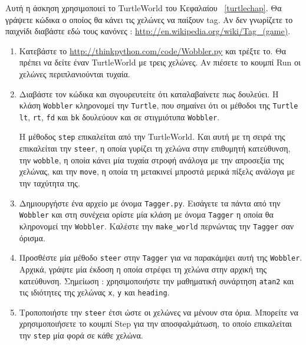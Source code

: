 \documentclass[10pt]{book}
\begin{document}
\begin{exercise}

Αυτή η άσκηση χρησιμοποιεί το  TurtleWorld  του Κεφαλαίου~ \ref{turtlechap}.   
Θα γράψετε κώδικα ο οποίος θα κάνει τις χελώνες να παίξουν  tag.  Αν δεν γνωρίζετε το 
παιχνίδι διαβάστε εδώ τους κανόνες : \url{http://en.wikipedia.org/wiki/Tag_(game)}.  

\begin{enumerate}

\item Κατεβάστε το  \url{http://thinkpython.com/code/Wobbler.py}  και τρέξτε το.  
Θα πρέπει να δείτε έναν  TurtleWorld  με τρεις χελώνες.   Αν πιέσετε το κουμπί 
 {\sf Run}  οι χελώνες περιπλανιούνται τυχαία.

\item Διαβάστε τον κώδικα και σιγουρευτείτε ότι καταλαβαίνετε πως δουλεύει.  
Η κλάση  {\tt Wobbler}  κληρονομεί την  {\tt Turtle},  που σημαίνει ότι 
οι μέθοδοι της  {\tt Turtle} {\tt lt}, {\tt rt}, {\tt fd}  και  {\tt bk}  
δουλεύουν και σε στιγμιότυπα  {\tt Wobbler}.  

Η μέθοδος  {\tt step}  επικαλείται από την  TurtleWorld.   Και αυτή με τη σειρά της επικαλείται την  
{\tt steer},  η οποία γυρίζει τη χελώνα στην επιθυμητή κατεύθυνση, την  {\tt wobble}, 
 η οποία κάνει μία τυχαία στροφή ανάλογα με την απροσεξία της χελώνας, 
και την  {\tt move},  η οποία τη μετακινεί μπροστά μερικά πίξελς ανάλογα με την ταχύτητα της.

\item Δημιουργήστε ένα αρχείο με όνομα  {\tt Tagger.py}.   Εισάγετε τα πάντα 
  από την  {\tt Wobbler}  και στη συνέχεια ορίστε μία κλάση με όνομα  {\tt Tagger} 
   η οποία θα κληρονομεί την  {\tt Wobbler}.   Καλέστε την  \verb"make_world" 
   περνώντας την  {\tt Tagger}  σαν όρισμα.

\item Προσθέστε μία μέθοδο  {\tt steer}  στην  {\tt Tagger}  για να παρακάμψει 
  αυτή της  {\tt Wobbler}.   Αρχικά, γράψτε μία έκδοση η οποία στρέφει τη χελώνα στην 
  αρχική της κατεύθυνση.  Σημείωση :  χρησιμοποιήστε την μαθηματική συνάρτηση  
  {\tt atan2}  και τις ιδιότητες της χελώνας  {\tt x}, {\tt y}  και  
  {\tt heading}. 

\item Τροποποιήστε την  {\tt steer}  έτσι ώστε οι χελώνες να μένουν στα όρια. 
  Μπορείτε να χρησιμοποιήσετε το κουμπί  {\sf Step}  για την αποσφαλμάτωση, το 
  οποίο επικαλείται την  {\tt step}  μία φορά σε κάθε χελώνα.


\end{enumerate}
\end{exercise}
\end{document}
